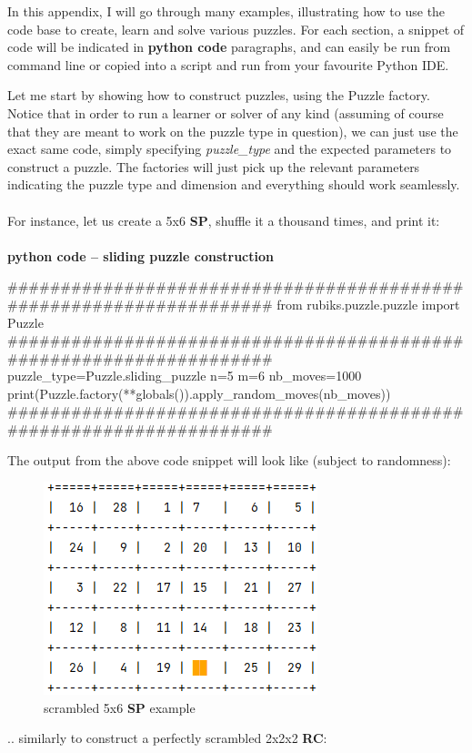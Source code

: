 

\label{sec:Examples} %


In this appendix, I will go through many examples, illustrating how to use the code base to create, learn and solve various puzzles. For each section, a snippet of code will be indicated in \afblue \textbf{python code} \black paragraphs, and can easily be run from command line or copied into a script and run from your favourite Python IDE.


Let me start by showing how to construct puzzles, using the Puzzle factory. Notice that in order to run a learner or solver of any kind (assuming of course that they are meant to work on the puzzle type in question), we can just use the exact same code, simply specifying \textit{puzzle\_type} and the expected parameters to construct a puzzle. The factories will just pick up the relevant parameters indicating the puzzle type and dimension and everything should work seamlessly.
\\
\\
For instance, let us create a 5x6 \textbf{SP}, shuffle it a thousand times, and print it:
\afblue
\paragraph{}{\textbf{python code -- sliding puzzle construction}}
\begin{python}
####################################################################
from rubiks.puzzle.puzzle import Puzzle
####################################################################
puzzle_type=Puzzle.sliding_puzzle
n=5
m=6
nb_moves=1000
print(Puzzle.factory(**globals()).apply_random_moves(nb_moves))
####################################################################
\end{python}
\black
The output from the above code snippet will look like (subject to randomness):

\begin{figure}[H]
\centering
\includegraphics[scale=0.8]{./Figures/examplespconstruction}
\caption[Examples]{scrambled 5x6 \textbf{SP} example}
\label{fig:examplespconstruction}
\end{figure}
.. similarly to construct a perfectly scrambled 2x2x2 \textbf{RC}:
\afblue
